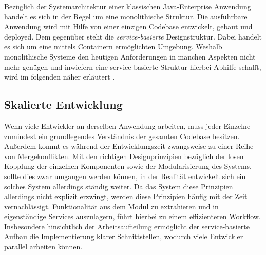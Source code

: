 



Bezüglich der Systemarchitektur einer klassischen Java-Enterprise Anwendung handelt es sich in der Regel um eine monolithische Struktur. Die ausführbare Anwendung wird mit Hilfe von einer einzigen Codebase entwickelt, gebaut und deployed. Dem gegenüber steht die \emph{service-basierte} Designstruktur. Dabei handelt es sich um eine mittels Containern ermöglichten Umgebung. Weshalb monolithische Systeme den heutigen Anforderungen in manchen Aspekten nicht mehr genügen und inwiefern eine service-basierte Struktur hierbei Abhilfe schafft, wird im folgenden näher erläutert \cite[Seite~42 ff.]{continuous-delivery}.


\subsection{Skalierte Entwicklung}
Wenn viele Entwickler an derselben Anwendung arbeiten, muss jeder Einzelne zumindest ein grundlegendes Verständnis der gesamten Codebase besitzen. Außerdem kommt es während der Entwicklungszeit zwangsweise zu einer Reihe von Mergekonflikten. Mit den richtigen Designprinzipien bezüglich der losen Kopplung der einzelnen Komponenten sowie der Modularisierung des Systems, sollte dies zwar umgangen werden können, in der Realität entwickelt sich ein solches System allerdings ständig weiter. Da das System diese Prinzipien allerdings nicht explizit erzwingt, werden diese Prinzipien häufig mit der Zeit vernachlässigt. Funktionalität aus dem Modul zu extrahieren und in eigenständige Services auszulagern, führt hierbei zu einem effizienteren Workflow. Insbesondere hinsichtlich der Arbeitsaufteilung ermöglicht der service-basierte Aufbau die Implementierung klarer Schnittstellen, wodurch viele Entwickler parallel arbeiten können.


